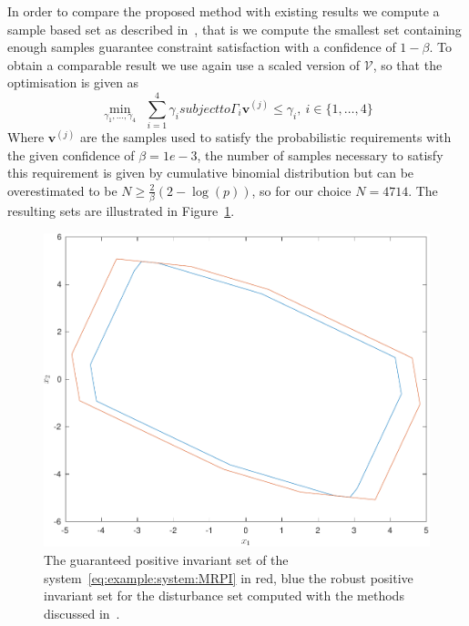 \documentclass{ifacconf}
\providecommand{\V}{\mathcal V}
\providecommand{\bfa}[1]{\mathbf{#1}}
\begin{document}
In order to compare the proposed method with existing results we compute a sample based set as described in~\cite{Zhang2015}, that is we compute the smallest set containing enough samples guarantee constraint satisfaction with a confidence of $1-\beta$.
%
To obtain a comparable result we use again use a scaled version of $\V$, so that the optimisation is given as
%
\begin{subequations}\label{eq:comparison:set}
\begin{equation}\min_{\gamma_1,\dots,\gamma_4} \  \ \sum_{i=1}^4\gamma_i
\end{equation}
subject to 
\begin{equation}
\Gamma_i \bfa{v}^{(j)}\leq \gamma_i ,\ i\in\{1,\dots,4\}
\end{equation}
\end{subequations}
%
Where $\bfa{v}^{(j)}$ are the samples used to satisfy the probabilistic requirements with the given confidence of $\beta=1e-3$, the number of samples necessary to satisfy this requirement is given by cumulative binomial distribution but can be overestimated to be $N \geq \frac{2}{\beta}(2-\log(p))$, so for our choice $N = 4714$.
%
The resulting sets are illustrated in Figure~\ref{fig:MRPI:optimised}.
%

\begin{figure}
\includegraphics[width=.95\linewidth]{MRPIsetOptimised.pdf}
\caption{The guaranteed positive invariant set of the system~\eqref{eq:example:system:MRPI} in red, blue the robust positive invariant set for the disturbance set computed with the methods discussed in~\cite{Zhang2015}.}
\label{fig:MRPI:optimised}
\vspace{4mm}\end{figure}
\end{document}
